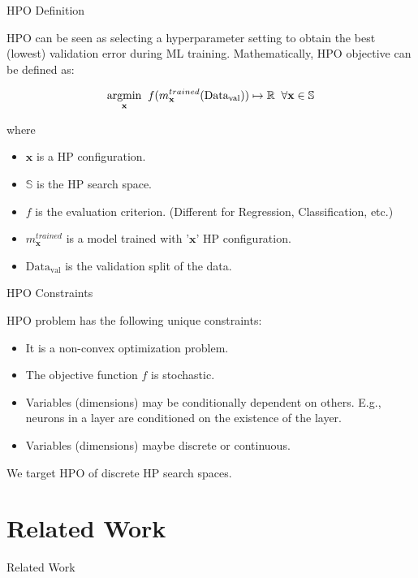 \documentclass{beamer}
\begin{document}
\begin{frame}[t]{HPO Definition}

HPO can be seen as selecting a hyperparameter setting to obtain the best (lowest) validation error during ML training.
Mathematically,  HPO objective can be defined as:

$$
\underset{\rm \textbf{x}}{\rm argmin} \;\; f(m^{trained}_{\textbf{x}}(\textrm{Data}_{\textrm{val}})) \mapsto \mathbb{R}  \;\;  \forall \textbf{x} \in \mathbb{S}
$$

where
\begin{itemize}
\item $\textbf{x}$ is a HP configuration.
\item $\mathbb{S}$ is the HP search space.
\item $f$ is the evaluation criterion. (Different for Regression,  Classification, etc.)
\item $m^{trained}_{\textbf{x}}$ is a model trained with '$\textbf{x}$' HP configuration.
\item $\textrm{Data}_{\textrm{val}}$ is the validation split of the data.
\end{itemize}

\end{frame}

\begin{frame}[t]{HPO Constraints}

HPO problem has the following unique constraints:

\begin{itemize}
\item It is a non-convex optimization problem.
\item The objective function $f$ is stochastic.
\item Variables (dimensions) may be conditionally dependent on others.  E.g.,  neurons in a layer are conditioned on the existence of the layer.
\item Variables (dimensions) maybe discrete or continuous.
\end{itemize}

We target HPO of discrete HP search spaces.

\end{frame}

\section{Related Work}

\begin{frame}

\centering
\LARGE{Related Work}

\end{frame}
\end{document}
